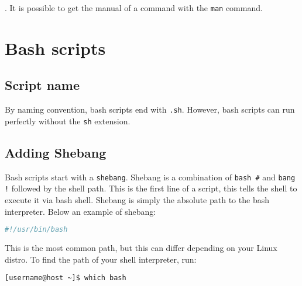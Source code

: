 \documentclass{article}
\newcommand{\inlinecode}[1]{\colorbox{backcolour}{\footnotesize{\texttt{#1}}}}
\begin{document}
\faWarning. It is possible to get the manual of a command with the \inlinecode{man} command.

\pagebreak
\section{Bash scripts}

\subsection{Script name}

By naming convention, bash scripts end with \inlinecode{.sh}. However, bash scripts can run perfectly without the \inlinecode{sh} extension.

\subsection{Adding Shebang}

Bash scripts start with a \inlinecode{shebang}. Shebang is a combination of \inlinecode{bash \#} and \inlinecode{bang !} followed by the shell path. This is the first line of a script, this tells the shell to execute it via bash shell. Shebang is simply the absolute path to the bash interpreter.
Below an example of shebang:

\begin{lstlisting}[style=command, language=bash]
#!/usr/bin/bash
\end{lstlisting}
This is the most common path, but this can differ depending on your Linux distro. To find the path of your shell interpreter, run:

\begin{lstlisting}[style=terminal]
[username@host ~]$ which bash
\end{lstlisting}
\end{document}
